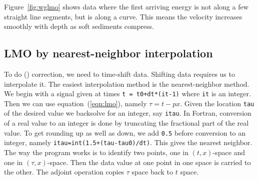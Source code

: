 
\par
Figure~\ref{fig:wglmo} shows data where the first arriving energy
is not along a few straight line segments,
but is along a curve.
This means the velocity increases smoothly with depth
as soft sediments compress.

\subsection{LMO by nearest-neighbor interpolation}
To do  () correction, we need to time-shift data.
Shifting data requires us to interpolate it.
The easiest interpolation method is the nearest-neighbor method.
We begin with a signal given at times {\tt t = t0+dt*(it-1)}
where {\tt it} is an integer.
Then we can use equation~(\ref{eqn:lmo}),
namely $\tau=t-px$.
Given the location {\tt tau} of the desired value
we backsolve for an integer, say {\tt itau}.
In Fortran, conversion of a real value to an integer is done by
truncating the fractional part of the real value.
To get rounding up as well as down,
we add
{\tt 0.5}
before conversion to an integer,
namely {\tt itau=int(1.5+(tau-tau0)/dt)}.
This gives the nearest neighbor.
The
way the program works is to identify two points,
one in $(t,x)$-space and one in $(\tau,x)$-space.
Then
the data value at one point in one space is carried to the other.
The adjoint operation copies $\tau$ space back to $t$ space.

